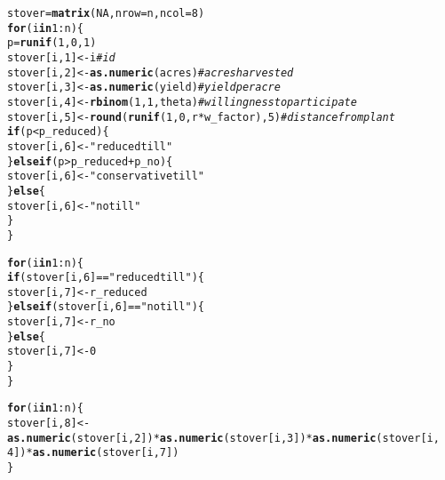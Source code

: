 \documentclass{article}\usepackage[]{graphicx}\usepackage[]{color}
\makeatletter
\newcommand{\hlnum}[1]{\textcolor[rgb]{0.686,0.059,0.569}{#1}}%
\newcommand{\hlstr}[1]{\textcolor[rgb]{0.192,0.494,0.8}{#1}}%
\newcommand{\hlcom}[1]{\textcolor[rgb]{0.678,0.584,0.686}{\textit{#1}}}%
\newcommand{\hlopt}[1]{\textcolor[rgb]{0,0,0}{#1}}%
\newcommand{\hlstd}[1]{\textcolor[rgb]{0.345,0.345,0.345}{#1}}%
\newcommand{\hlkwa}[1]{\textcolor[rgb]{0.161,0.373,0.58}{\textbf{#1}}}%
\newcommand{\hlkwb}[1]{\textcolor[rgb]{0.69,0.353,0.396}{#1}}%
\newcommand{\hlkwc}[1]{\textcolor[rgb]{0.333,0.667,0.333}{#1}}%
\newcommand{\hlkwd}[1]{\textcolor[rgb]{0.737,0.353,0.396}{\textbf{#1}}}%
\newenvironment{kframe}{%
 \def\at@end@of@kframe{}%
 \ifinner\ifhmode%
  \def\at@end@of@kframe{\end{minipage}}%
  \begin{minipage}{\columnwidth}%
 \fi\fi%
 \def\FrameCommand##1{\hskip\@totalleftmargin \hskip-\fboxsep
 \colorbox{shadecolor}{##1}\hskip-\fboxsep
     \hskip-\linewidth \hskip-\@totalleftmargin \hskip\columnwidth}%
 \MakeFramed {\advance\hsize-\width
   \@totalleftmargin\z@ \linewidth\hsize
   \@setminipage}}%
 {\par\unskip\endMakeFramed%
 \at@end@of@kframe}
\newenvironment{knitrout}{}{} %
\makeatother
\begin{document}
\begin{knitrout}
\color{fgcolor}\begin{kframe}
\begin{alltt}
\hlstd{stover} \hlkwb{=} \hlkwd{matrix}\hlstd{(}\hlnum{NA}\hlstd{,} \hlkwc{nrow} \hlstd{= n,} \hlkwc{ncol} \hlstd{=} \hlnum{8}\hlstd{)}
\hlkwa{for} \hlstd{(i} \hlkwa{in} \hlnum{1}\hlopt{:}\hlstd{n) \{}
    \hlstd{p} \hlkwb{=} \hlkwd{runif}\hlstd{(}\hlnum{1}\hlstd{,} \hlnum{0}\hlstd{,} \hlnum{1}\hlstd{)}
    \hlstd{stover[i,} \hlnum{1}\hlstd{]} \hlkwb{<-} \hlstd{i}  \hlcom{#id}
    \hlstd{stover[i,} \hlnum{2}\hlstd{]} \hlkwb{<-} \hlkwd{as.numeric}\hlstd{(acres)}  \hlcom{#acres harvested}
    \hlstd{stover[i,} \hlnum{3}\hlstd{]} \hlkwb{<-} \hlkwd{as.numeric}\hlstd{(yield)}  \hlcom{#yield per acre}
    \hlstd{stover[i,} \hlnum{4}\hlstd{]} \hlkwb{<-} \hlkwd{rbinom}\hlstd{(}\hlnum{1}\hlstd{,} \hlnum{1}\hlstd{, theta)}  \hlcom{#willingness to participate}
    \hlstd{stover[i,} \hlnum{5}\hlstd{]} \hlkwb{<-} \hlkwd{round}\hlstd{(}\hlkwd{runif}\hlstd{(}\hlnum{1}\hlstd{,} \hlnum{0}\hlstd{, r} \hlopt{*} \hlstd{w_factor),} \hlnum{5}\hlstd{)}  \hlcom{#distance from plant}
    \hlkwa{if} \hlstd{(p} \hlopt{<} \hlstd{p_reduced) \{}
        \hlstd{stover[i,} \hlnum{6}\hlstd{]} \hlkwb{<-} \hlstr{"reduced till"}
    \hlstd{\}} \hlkwa{else if} \hlstd{(p} \hlopt{>} \hlstd{p_reduced} \hlopt{+} \hlstd{p_no) \{}
        \hlstd{stover[i,} \hlnum{6}\hlstd{]} \hlkwb{<-} \hlstr{"conservative till"}
    \hlstd{\}} \hlkwa{else} \hlstd{\{}
        \hlstd{stover[i,} \hlnum{6}\hlstd{]} \hlkwb{<-} \hlstr{"no till"}
    \hlstd{\}}
\hlstd{\}}

\hlkwa{for} \hlstd{(i} \hlkwa{in} \hlnum{1}\hlopt{:}\hlstd{n) \{}
    \hlkwa{if} \hlstd{(stover[i,} \hlnum{6}\hlstd{]} \hlopt{==} \hlstr{"reduced till"}\hlstd{) \{}
        \hlstd{stover[i,} \hlnum{7}\hlstd{]} \hlkwb{<-} \hlstd{r_reduced}
    \hlstd{\}} \hlkwa{else if} \hlstd{(stover[i,} \hlnum{6}\hlstd{]} \hlopt{==} \hlstr{"no till"}\hlstd{) \{}
        \hlstd{stover[i,} \hlnum{7}\hlstd{]} \hlkwb{<-} \hlstd{r_no}
    \hlstd{\}} \hlkwa{else} \hlstd{\{}
        \hlstd{stover[i,} \hlnum{7}\hlstd{]} \hlkwb{<-} \hlnum{0}
    \hlstd{\}}
\hlstd{\}}

\hlkwa{for} \hlstd{(i} \hlkwa{in} \hlnum{1}\hlopt{:}\hlstd{n) \{}
    \hlstd{stover[i,} \hlnum{8}\hlstd{]} \hlkwb{<-} \hlkwd{as.numeric}\hlstd{(stover[i,} \hlnum{2}\hlstd{])} \hlopt{*} \hlkwd{as.numeric}\hlstd{(stover[i,} \hlnum{3}\hlstd{])} \hlopt{*} \hlkwd{as.numeric}\hlstd{(stover[i,}
        \hlnum{4}\hlstd{])} \hlopt{*} \hlkwd{as.numeric}\hlstd{(stover[i,} \hlnum{7}\hlstd{])}
\hlstd{\}}


\end{alltt}
\end{kframe}
\end{knitrout}
\end{document}
